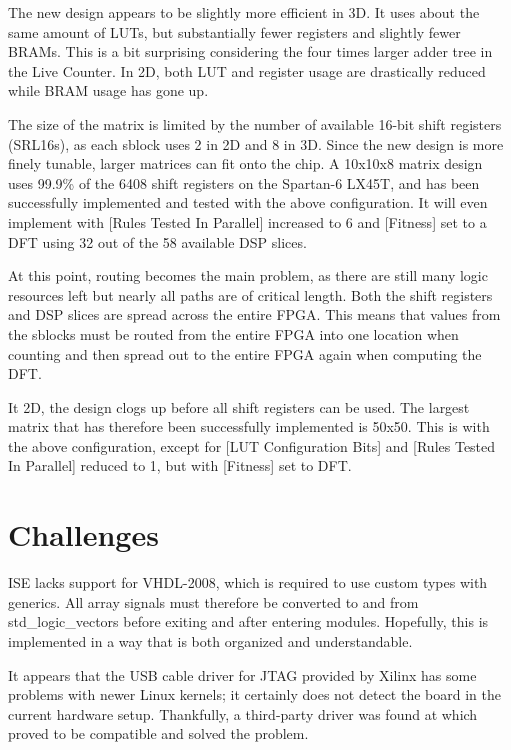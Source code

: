 The new design appears to be slightly more efficient in 3D.
It uses about the same amount of LUTs, but substantially fewer registers and slightly fewer BRAMs.
This is a bit surprising considering the four times larger adder tree in the Live Counter.
In 2D, both LUT and register usage are drastically reduced while BRAM usage has gone up.

The size of the matrix is limited by the number of available 16-bit shift registers (SRL16s), as each sblock uses 2 in 2D and 8 in 3D.
Since the new design is more finely tunable, larger matrices can fit onto the chip.
A 10x10x8 matrix design uses 99.9\% of the 6408 shift registers on the Spartan-6 LX45T, and has been successfully implemented and tested with the above configuration.
It will even implement with [Rules Tested In Parallel] increased to 6 and [Fitness] set to a DFT using 32 out of the 58 available DSP slices.

At this point, routing becomes the main problem, as there are still many logic resources left but nearly all paths are of critical length.
Both the shift registers and DSP slices are spread across the entire FPGA.
This means that values from the sblocks must be routed from the entire FPGA into one location when counting and then spread out to the entire FPGA again when computing the DFT.

It 2D, the design clogs up before all shift registers can be used.
The largest matrix that has therefore been successfully implemented is 50x50.
This is with the above configuration, except for [LUT Configuration Bits] and [Rules Tested In Parallel] reduced to 1, but with [Fitness] set to DFT.


\section{Challenges}
\label{sec:challenges}

ISE lacks support for VHDL-2008, which is required to use custom types with generics.
All array signals must therefore be converted to and from std\_logic\_vectors before exiting and after entering modules.
Hopefully, this is implemented in a way that is both organized and understandable.

It appears that the USB cable driver for JTAG provided by Xilinx has some problems with newer Linux kernels; it certainly does not detect the board in the current hardware setup.
Thankfully, a third-party driver was found at \cite{usbdriver} which proved to be compatible and solved the problem.

